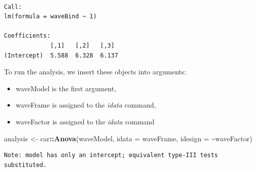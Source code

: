 \documentclass[
  11pt,
]{book}
\newenvironment{Shaded}{\begin{snugshade}}{\end{snugshade}}
\newcommand{\AttributeTok}[1]{\textcolor[rgb]{0.27,0.27,0.27}{#1}}
\newcommand{\CommentTok}[1]{\textcolor[rgb]{0.37,0.37,0.37}{\textit{#1}}}
\newcommand{\DecValTok}[1]{\textcolor[rgb]{0.06,0.06,0.06}{#1}}
\newcommand{\FunctionTok}[1]{\textcolor[rgb]{0.27,0.27,0.27}{\textbf{#1}}}
\newcommand{\NormalTok}[1]{#1}
\newcommand{\OtherTok}[1]{\textcolor[rgb]{0.37,0.37,0.37}{#1}}
\newcommand{\SpecialCharTok}[1]{\textcolor[rgb]{0.43,0.43,0.43}{\textbf{#1}}}
\providecommand{\tightlist}{%
  \setlength{\itemsep}{0pt}\setlength{\parskip}{0pt}}
\begin{document}
\begin{Shaded}
\end{Shaded}

\begin{verbatim}

Call:
lm(formula = waveBind ~ 1)

Coefficients:
             [,1]   [,2]   [,3] 
(Intercept)  5.588  6.328  6.137
\end{verbatim}

To run the analysis, we insert these objects into arguments:

\begin{itemize}
\tightlist
\item
  waveModel is the first argument,
\item
  waveFrame is assigned to the \emph{idata} command,
\item
  waveFactor is assigned to the \emph{idata} command
\end{itemize}

\begin{Shaded}
\begin{Highlighting}[]
\NormalTok{analysis }\OtherTok{\textless{}{-}}\NormalTok{ car}\SpecialCharTok{::}\FunctionTok{Anova}\NormalTok{(waveModel, }\AttributeTok{idata =}\NormalTok{ waveFrame, }\AttributeTok{idesign =} \SpecialCharTok{\textasciitilde{}}\NormalTok{waveFactor)}
\end{Highlighting}
\end{Shaded}

\begin{verbatim}
Note: model has only an intercept; equivalent type-III tests substituted.
\end{verbatim}
\end{document}

